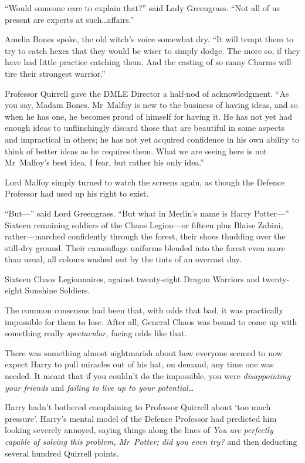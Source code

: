 “Would someone care to explain that?” said Lady Greengrass. “Not all of us
present are experts at such…affairs.”

Amelia Bones spoke, the old witch’s voice somewhat dry. “It will tempt them to
try to catch hexes that they would be wiser to simply dodge. The more so, if
they have had little practice catching them. And the casting of so many Charms
will tire their strongest warrior.”

Professor Quirrell gave the DMLE Director a half-nod of acknowledgment. “As you
say, Madam Bones. Mr~Malfoy is new to the business of having ideas, and so
when he has one, he becomes proud of himself for having it. He has not yet had
enough ideas to unflinchingly discard those that are beautiful in some aspects
and impractical in others; he has not yet acquired confidence in his own
ability to think of better ideas as he requires them. What we are seeing here
is not Mr~Malfoy’s best idea, I fear, but rather his only idea.”

Lord Malfoy simply turned to watch the screens again, as though the Defence
Professor had used up his right to exist.

“But—” said Lord Greengrass. “But what in Merlin’s name is Harry Potter—”
\later
Sixteen remaining soldiers of the Chaos Legion—or fifteen plus Blaise Zabini,
rather—marched confidently through the forest, their shoes thudding over the
still-dry ground. Their camouflage uniforms blended into the forest even more
than usual, all colours washed out by the tints of an overcast day.

Sixteen Chaos Legionnaires, against twenty-eight Dragon Warriors and
twenty-eight Sunshine Soldiers.

The common consensus had been that, with odds that bad, it was practically
impossible for them to lose. After all, General Chaos was bound to come up with
something really \emph{spectacular,} facing odds like that.

There was something almost nightmarish about how everyone seemed to now expect
Harry to pull miracles out of his hat, on demand, any time one was needed. It
meant that if you couldn’t do the impossible, you were \emph{disappointing your
friends} and \emph{failing to live up to your potential…}

Harry hadn’t bothered complaining to Professor Quirrell about ‘too much
pressure’. Harry’s mental model of the Defence Professor had predicted him
looking severely annoyed, saying things along the lines of \emph{You are
perfectly capable of solving this problem, Mr~Potter; did you even try?} and
then deducting several hundred Quirrell points.


